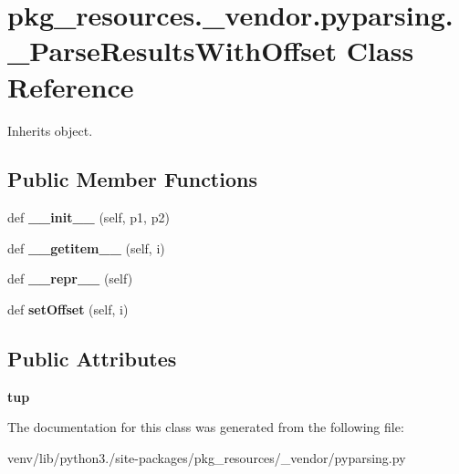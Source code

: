\hypertarget{classpkg__resources_1_1__vendor_1_1pyparsing_1_1___parse_results_with_offset}{}\section{pkg\+\_\+resources.\+\_\+vendor.\+pyparsing.\+\_\+\+Parse\+Results\+With\+Offset Class Reference}
\label{classpkg__resources_1_1__vendor_1_1pyparsing_1_1___parse_results_with_offset}


Inherits object.

\subsection*{Public Member Functions}
\begin{DoxyCompactItemize}
\item 
\mbox{\label{classpkg__resources_1_1__vendor_1_1pyparsing_1_1___parse_results_with_offset_a79050bbc59aea16482a64483b54f3238}} 
def {\bfseries \+\_\+\+\_\+init\+\_\+\+\_\+} (self, p1, p2)
\item 
\mbox{\label{classpkg__resources_1_1__vendor_1_1pyparsing_1_1___parse_results_with_offset_afc6ea50dfa25c70b0736b537d52bf417}} 
def {\bfseries \+\_\+\+\_\+getitem\+\_\+\+\_\+} (self, i)
\item 
\mbox{\label{classpkg__resources_1_1__vendor_1_1pyparsing_1_1___parse_results_with_offset_a66989c01419887a1c05c26e871278dcd}} 
def {\bfseries \+\_\+\+\_\+repr\+\_\+\+\_\+} (self)
\item 
\mbox{\label{classpkg__resources_1_1__vendor_1_1pyparsing_1_1___parse_results_with_offset_a97fbc26cda03a043af01ff21cc427916}} 
def {\bfseries set\+Offset} (self, i)
\end{DoxyCompactItemize}
\subsection*{Public Attributes}
\begin{DoxyCompactItemize}
\item 
\mbox{\label{classpkg__resources_1_1__vendor_1_1pyparsing_1_1___parse_results_with_offset_ad6b4d6651d9ba758c96dd138b5774e87}} 
{\bfseries tup}
\end{DoxyCompactItemize}


The documentation for this class was generated from the following file\+:\begin{DoxyCompactItemize}
\item 
venv/lib/python3./site-\/packages/pkg\+\_\+resources/\+\_\+vendor/pyparsing.\+py\end{DoxyCompactItemize}
